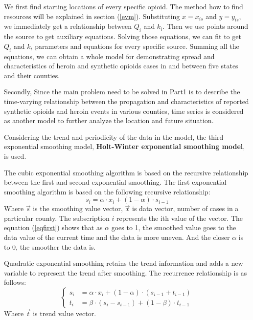 \documentclass{mcmthesis}
\numberwithin{equation}{section}
\numberwithin{figure}{section}
\numberwithin{table}{section}
\theoremstyle{mydef}
\begin{document}
We first find starting locations of every specific opioid. The method how to find resources will be explained in section (\ref{evm}). Substituting $x=x_{is}$ and $y=y_{is}$, we immediately get a relationship between $Q_i$ and $k_i$. Then we use points around the source to get auxiliary equations. Solving those equations, we can fit to get $Q_i$ and $k_i$ parameters and equations for every specific source.  Summing all the equations, we can obtain a whole model for demonstrating spread and characteristics of heroin and synthetic opioids cases in and between five states and their counties.

Secondly, Since the main problem need to be solved in Part1 is to describe the time-varying relationship between the propagation and characteristics of reported synthetic opioids and heroin events in various counties, time series is considered as another model to further analyze the location and future situation.

Considering the trend and periodicity of the data in the model, the third exponential smoothing model, {\bf{Holt-Winter exponential smoothing model}}, is used\cite{b2}.

The cubic exponential smoothing algorithm is based on the recursive relationship between the first and second exponential smoothing. The first exponential smoothing algorithm is based on the following recursive relationship:
\begin{equation}
s_i=\alpha\cdot x_i+(1-\alpha)\cdot s_{i-1}
\label{eqfirst}
\end{equation}
Where $\vec{s}$ is the smoothing value vector, $\vec{x}$ is data vector, number of cases in a particular county. The subscription $i$ represents the ith value of the vector. The equation (\ref{eqfirst}) shows that as $\alpha$ goes to 1, the smoothed value goes to the data value of the current time and the data is more uneven. And the closer $\alpha$ is to 0, the smoother the data is.

Quadratic exponential smoothing retains the trend information and adds a new variable to represent the trend after smoothing. The recurrence relationship is as follows:
\begin{equation}
\left\{
\begin{aligned}
s_i&=\alpha \cdot x_i+(1-\alpha)\cdot(s_{i-1}+t_{i-1})\\
t_i&=\beta\cdot(s_i-s_{i-1})+(1-\beta)\cdot t_{i-1}
\end{aligned}
\right.
\end{equation}
Where $\vec{t}$ is trend value vector.
\end{document}
